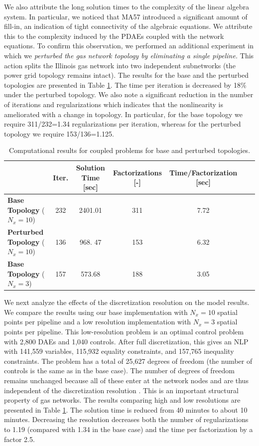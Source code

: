 \documentclass[11pt,twoside]{article}
\begin{document}
We also attribute the long solution times to the complexity of the linear algebra system. In particular, we noticed that MA57 introduced a significant amount of fill-in, an indication of tight connectivity of the algebraic equations. We attribute this to the complexity induced by the PDAEs coupled with the network equations. To confirm this observation, we performed an additional experiment in which we {\em perturbed the gas network topology by eliminating a single pipeline.} This action splits the Illinois gas network into two independent subnetworks (the power grid topology remains intact). The results for the base and the perturbed topologies are presented in Table \ref{table:compu}. The time per iteration is decreased by 18\% under the perturbed topology.  We also note a significant reduction in the number of iterations and regularizations which indicates that the nonlinearity is ameliorated with a change in topology. In particular, for the base topology we require 311/232=1.34 regularizations per iteration, whereas for the perturbed topology we require 153/136=1.125.  

\begin{table}[htp]
\small
\caption{Computational results for coupled problems for base and perturbed topologies.}
\begin{center}
\begin{tabular}{lcccccc}
                  & Iter. & Solution Time [sec] & Factorizations [-] & Time/Factorization [sec]\\
\hline {\bf Base Topology}  ($N_x=10$)&  232 & 2401.01 & 311 & 7.72\\
{\bf Perturbed Topology} ($N_x=10$)&   136 & 968. 47&  153  & 6.32\\
{\bf Base Topology} ($N_x=3$)&   157 & 573.68&  188   &3.05                      
\end{tabular}
\end{center}
\label{table:compu}
\end{table}%

We next analyze the effects of the discretization resolution on the model results. We compare the results using our base implementation with $N_x=10$ spatial points per pipeline and a low resolution implementation with $N_x=3$ spatial points per pipeline. This low-resolution problem is an optimal control problem with 2,800 DAEs and 1,040 controls. After full discretization, this gives an NLP with 141,559 variables, 115,932 equality constraints, and 157,765 inequality constraints. The problem has a total of 25,627 degrees of freedom (the number of controls is the same as in the base case). The number of degrees of freedom remains unchanged because all of these enter at the network nodes and are thus independent of the discretization resolution \cite{zavalastochgas}. This is an important structural property of gas networks. The results comparing high and low resolutions are presented in Table \ref{table:compu}. The solution time is reduced from 40 minutes to about 10 minutes. Decreasing the resolution decreases both the number of regularizations to 1.19 (compared with 1.34 in the base case) and the time per factorization by a factor 2.5.  
\end{document}
